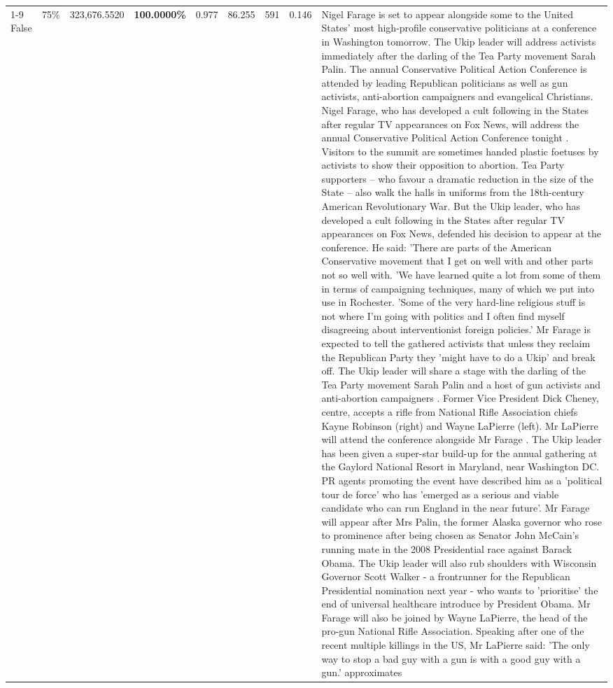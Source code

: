 \begin{table}[H]
\begin{tabular}{lllrlllll}
\cline{1-9} \cline{2-9}
False & 75\% & 323,676.5520 & \bfseries \color{red} 100.0000\% & 0.977 & 86.255 & 591 & 0.146 & Nigel Farage is set to appear alongside some to the United States' most high-profile conservative politicians at a conference in Washington tomorrow. The Ukip leader will address activists immediately after the darling of the Tea Party movement Sarah Palin. The annual Conservative Political Action Conference is attended by leading Republican politicians as well as gun activists, anti-abortion campaigners and evangelical Christians. Nigel Farage, who has developed a cult following in the States after regular TV appearances on Fox News, will address the annual Conservative Political Action Conference tonight . Visitors to the summit are sometimes handed plastic foetuses by activists to show their opposition to abortion. Tea Party supporters – who favour a dramatic reduction in the size of the State – also walk the halls in uniforms from the 18th-century American Revolutionary War. But the Ukip leader, who has developed a cult following in the States after regular TV appearances on Fox News, defended his decision to appear at the conference. He said: 'There are parts of the American Conservative movement that I get on well with and other parts not so well with. 'We have learned quite a lot from some of them in terms of campaigning techniques, many of which we put into use in Rochester. 'Some of the very hard-line religious stuff is not where I'm going with politics and I often find myself disagreeing about interventionist foreign policies.' Mr Farage is expected to tell the gathered activists that unless they reclaim the Republican Party they 'might have to do a Ukip' and break off. The Ukip leader will share a stage with the darling of the Tea Party movement Sarah Palin and a host of gun activists and anti-abortion campaigners . Former Vice President Dick Cheney, centre, accepts a rifle from National Rifle Association chiefs Kayne Robinson (right) and Wayne LaPierre (left). Mr LaPierre will attend the conference alongside Mr Farage . The Ukip leader has been given a super-star build-up for the annual gathering at the Gaylord National Resort in Maryland, near Washington DC. PR agents promoting the event have described him as a 'political tour de force' who has 'emerged as a serious and viable candidate who can run England in the near future'. Mr Farage will appear after Mrs Palin, the former Alaska governor who rose to prominence after being chosen as Senator John McCain's running mate in the 2008 Presidential race against Barack Obama. The Ukip leader will also rub shoulders with Wisconsin Governor Scott Walker - a frontrunner for the Republican Presidential nomination next year - who wants to 'prioritise' the end of universal healthcare introduce by President Obama. Mr Farage will also be joined by Wayne LaPierre, the head of the pro-gun National Rifle Association. Speaking after one of the recent multiple killings in the US, Mr LaPierre said: 'The only way to stop a bad guy with a gun is with a good guy with a gun.' approximates \\

\end{tabular}
\end{table}
